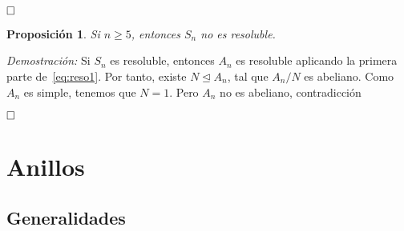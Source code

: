 \documentclass[12pt]{article}
\newtheorem{proposition}[theorem]{Proposición}
\begin{document}
$\hfill \square$

\begin{proposition}Si $n\geq 5$, entonces $S_n$ no es resoluble.
\end{proposition}
\emph{Demostración: }Si $S_n$ es resoluble, entonces $A_n$ es resoluble aplicando la primera parte de~\ref{eq:reso1}. Por tanto, existe $N \unlhd A_n$, tal que $A_n/N$ es abeliano. Como $A_n$ es simple, tenemos que $N = 1$. Pero $A_n$ no es abeliano, contradicción

$\hfill \square$

\newpage
\section{Anillos}
\subsection{Generalidades}
\end{document}
